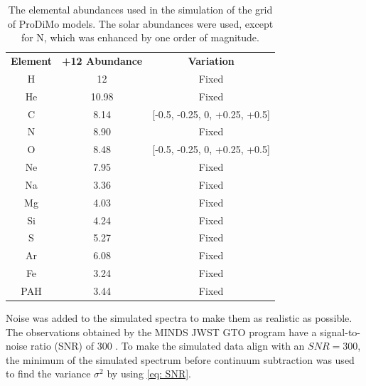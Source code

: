 \documentclass[twoside, single, authoryear, semicolon, 12pt]{lion-msc}
\newcommand{\4}{$_4$}
\newcommand{\3}{$_3$}
\newcommand{\2}{$_2$}
\begin{document}
\begin{table}[H]
\centering
\begin{tabular}{@{}ccc@{}}
                                  &                             &                            \\ \hline\midrule
\textbf{Element} & \textbf{+12 Abundance} & \textbf{Variation}            \\ \midrule
H                & 12                     & Fixed                         \\
He               & 10.98                 & Fixed                         \\
C                & 8.14                  & {[}-0.5, -0.25, 0, +0.25, +0.5{]} \\
N                & 8.90                  & Fixed                         \\
O                & 8.48                  & {[}-0.5, -0.25, 0, +0.25, +0.5{]} \\
Ne               & 7.95                  & Fixed                         \\
Na               & 3.36                  & Fixed                         \\
Mg               & 4.03                  & Fixed                         \\
Si               & 4.24                  & Fixed                         \\
S                & 5.27                  & Fixed                         \\
Ar               & 6.08                  & Fixed                         \\
Fe               & 3.24                  & Fixed                         \\
PAH              & 3.44                  & Fixed                         \\ \bottomrule
\end{tabular}
\caption{The elemental abundances used in the simulation of the grid of ProDiMo models. The solar abundances were used, except for N, which was enhanced by one order of magnitude.}
\label{tab: abundances}
\end{table}

Noise was added to the simulated spectra to make them as realistic as possible. The observations obtained by the MINDS JWST GTO program have a signal-to-noise ratio (SNR) of 300 \citep{henning2024mindsjwstmirimidinfrared}. To make the simulated data align with an $SNR = 300$, the minimum of the simulated spectrum before continuum subtraction was used to find the variance $\sigma^2$ by using \autoref{eq: SNR}.
\end{document}
